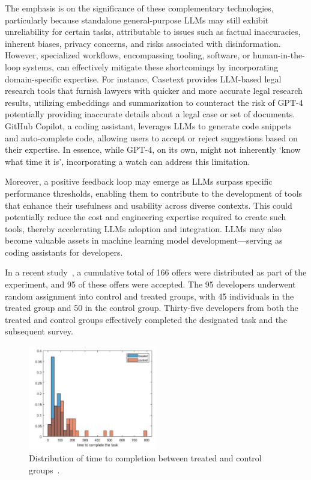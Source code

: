 \documentclass[a4paper,oneside]{book}
\begin{document}
The emphasis is on the significance of these complementary technologies, particularly because standalone general-purpose LLMs may still exhibit unreliability for certain tasks, attributable to issues such as factual inaccuracies, inherent biases, privacy concerns, and risks associated with disinformation. However, specialized workflows, encompassing tooling, software, or human-in-the-loop systems, can effectively mitigate these shortcomings by incorporating domain-specific expertise. For instance, Casetext provides LLM-based legal research tools that furnish lawyers with quicker and more accurate legal research results, utilizing embeddings and summarization to counteract the risk of GPT-4 potentially providing inaccurate details about a legal case or set of documents. GitHub Copilot, a coding assistant, leverages LLMs to generate code snippets and auto-complete code, allowing users to accept or reject suggestions based on their expertise. In essence, while GPT-4, on its own, might not inherently `know what time it is', incorporating a watch can address this limitation.

Moreover, a positive feedback loop may emerge as LLMs surpass specific performance thresholds, enabling them to contribute to the development of tools that enhance their usefulness and usability across diverse contexts. This could potentially reduce the cost and engineering expertise required to create such tools, thereby accelerating LLMs adoption and integration. LLMs may also become valuable assets in machine learning model development—serving as coding assistants for developers.

In a recent study~\cite{peng2023impact}, a cumulative total of 166 offers were distributed as part of the experiment, and 95 of these offers were accepted. The 95 developers underwent random assignment into control and treated groups, with 45 individuals in the treated group and 50 in the control group. Thirty-five developers from both the treated and control groups effectively completed the designated task and the subsequent survey.

\begin{figure}[!htb]
  \centering
  \includegraphics[width=0.5\textwidth]{img/task_completion_time}
  \caption{Distribution of time to completion between treated and control groups~\cite{peng2023impact}.}\label{fig:task_completion_time}
\end{figure}
\end{document}
